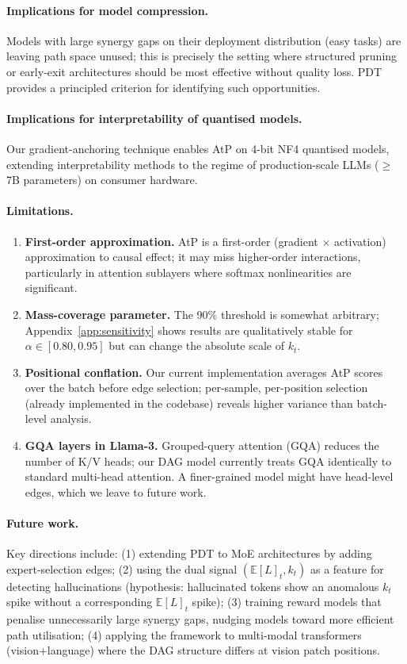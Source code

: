 \documentclass{article}
\newcommand{\E}{\mathbb{E}}
\begin{document}
\paragraph{Implications for model compression.}
Models with large synergy gaps on their deployment distribution (easy tasks) are
leaving path space unused; this is precisely the setting where structured pruning
or early-exit architectures should be most effective without quality loss.
PDT provides a principled criterion for identifying such opportunities.

\paragraph{Implications for interpretability of quantised models.}
Our gradient-anchoring technique enables AtP on 4-bit NF4 quantised models,
extending interpretability methods to the regime of production-scale LLMs
($\geq$7B parameters) on consumer hardware.

\paragraph{Limitations.}
\begin{enumerate}
  \item \textbf{First-order approximation.} AtP is a first-order (gradient $\times$ activation)
        approximation to causal effect; it may miss higher-order interactions, particularly
        in attention sublayers where softmax nonlinearities are significant.
  \item \textbf{Mass-coverage parameter.} The 90\% threshold is somewhat arbitrary;
        Appendix~\ref{app:sensitivity} shows results are qualitatively stable for
        $\alpha \in [0.80, 0.95]$ but can change the absolute scale of $k_t$.
  \item \textbf{Positional conflation.} Our current implementation averages AtP
        scores over the batch before edge selection; per-sample, per-position
        selection (already implemented in the codebase) reveals higher variance
        than batch-level analysis.
  \item \textbf{GQA layers in Llama-3.} Grouped-query attention (GQA) reduces the
        number of K/V heads; our DAG model currently treats GQA identically to
        standard multi-head attention.  A finer-grained model might have head-level
        edges, which we leave to future work.
\end{enumerate}

\paragraph{Future work.}
Key directions include: (1) extending PDT to MoE architectures by adding
expert-selection edges; (2) using the dual signal $(\E[L]_t, k_t)$ as a feature for
detecting hallucinations (hypothesis: hallucinated tokens show an anomalous $k_t$
spike without a corresponding $\E[L]_t$ spike); (3) training reward models that
penalise unnecessarily large synergy gaps, nudging models toward more efficient path
utilisation; (4) applying the framework to multi-modal transformers (vision+language)
where the DAG structure differs at vision patch positions.
\end{document}
